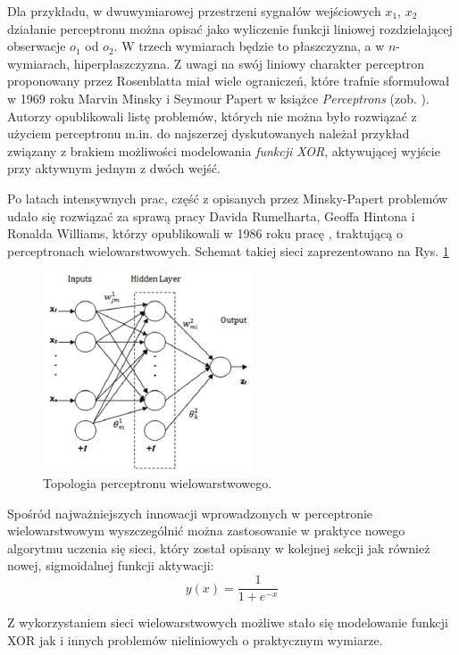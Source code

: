 Dla przykładu, w dwuwymiarowej przestrzeni sygnałów wejściowych {$x_1$, $x_2$}  działanie perceptronu można opisać jako wyliczenie funkcji liniowej rozdzielającej obserwacje $o_1$ od $o_2$. W trzech wymiarach będzie to płaszczyzna, a w $n$-wymiarach, hiperpłaszczyzna. Z uwagi na swój liniowy charakter perceptron proponowany przez Rosenblatta miał wiele ograniczeń, które trafnie sformułował w 1969 roku Marvin Minsky i Seymour Papert w książce \textit{Perceptrons} (zob. \cite{Minsky1969}). Autorzy opublikowali listę problemów, których nie można było rozwiązać z użyciem perceptronu m.in. do najszerzej dyskutowanych należał przykład związany z brakiem możliwości modelowania \textit{funkcji XOR}, aktywującej wyjście przy aktywnym jednym z dwóch wejść.

Po latach intensywnych prac, część z opisanych przez Minsky-Papert problemów udało się rozwiązać za sprawą pracy Davida Rumelharta, Geoffa Hintona i Ronalda Williams, którzy opublikowali w 1986 roku pracę \cite{Rumelhart1986}, traktującą o perceptronach wielowarstwowych. Schemat takiej sieci zaprezentowano na Rys. \ref{MLperceptron}
\begin{figure}[h!]
	\centering
	\includegraphics[width=0.55\textwidth]{figures/MLperceptron.png}
	\caption{Topologia perceptronu wielowarstwowego.}
	\label{MLperceptron}
\end{figure}

Spośród najważniejszych innowacji wprowadzonych w perceptronie wielowarstwowym wyszczególnić można zastosowanie w praktyce nowego algorytmu uczenia się sieci, który został opisany w kolejnej sekcji jak również nowej, sigmoidalnej funkcji aktywacji:
\begin{equation}
\label{eqSigActFunc}
y(x) = \frac{1}{1 + e^{-x}}
\end{equation}

Z wykorzystaniem sieci wielowarstwowych możliwe stało się modelowanie funkcji XOR jak i innych problemów nieliniowych o praktycznym wymiarze. 

